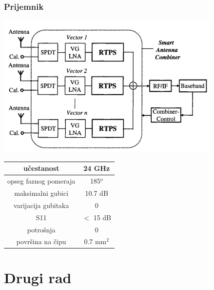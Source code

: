 \documentclass{beamer}
\begin{document}

\begin{frame}
  \frametitle{Prijemnik}
  \includegraphics[width=0.7\linewidth]{ellinger_receiver.png}
\end{frame}




\begin{frame}

\begin{center}
\begin{tabular}{ | c | c | }
  \hline
  učestanost & 24 GHz \\
  \hline 
  opseg faznog pomeraja & 185$^o$ \\  
  \hline
  maksimalni gubici & 10.7 dB \\
  \hline
  varijacija gubitaka & 0 \\
  \hline
  S11 & $<$ 15 dB \\
  \hline
  potrošnja & 0 \\
  \hline
  površina na čipu & 0.7 mm$^2$  \\  
  \hline
\end{tabular}
\end{center}
\end{frame}

\section{Drugi rad}


\end{document}
